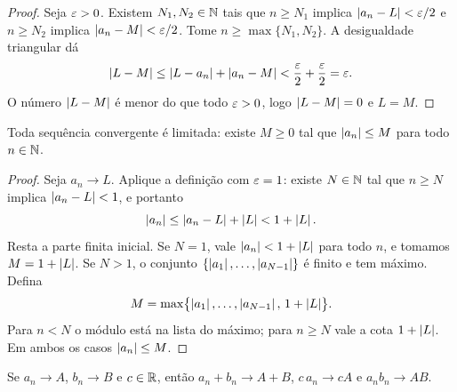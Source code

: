 \documentclass[11pt,a4paper]{article}
\begin{document}
\begin{proof}
Seja \(\varepsilon>0\). Existem \(N_1,N_2\in\mathbb{N}\) tais que \(n\ge N_1\) implica \(\left\lvert a_n-L \right\rvert<\varepsilon/2\) e \(n\ge N_2\) implica \(\left\lvert a_n-M \right\rvert<\varepsilon/2\). Tome \(n\ge\max\{N_1,N_2\}\). A desigualdade triangular dá
\[
\left\lvert L-M \right\rvert
\le\left\lvert L-a_n \right\rvert+\left\lvert a_n-M \right\rvert
<\frac{\varepsilon}{2}+\frac{\varepsilon}{2}
=\varepsilon.
\]
O número \(\left\lvert L-M \right\rvert\) é menor do que todo \(\varepsilon>0\), logo \(\left\lvert L-M \right\rvert=0\) e \(L=M\).
\end{proof}

\begin{teorema}
Toda sequência convergente é limitada: existe \(M\ge 0\) tal que \(\left\lvert a_n \right\rvert\le M\) para todo \(n\in\mathbb{N}\).
\end{teorema}

\begin{proof}
Seja \(a_n\to L\). Aplique a definição com \(\varepsilon=1\): existe \(N\in\mathbb{N}\) tal que \(n\ge N\) implica \(\left\lvert a_n-L \right\rvert<1\), e portanto
\[
\left\lvert a_n \right\rvert\le\left\lvert a_n-L \right\rvert+\left\lvert L \right\rvert<1+\left\lvert L \right\rvert.
\]
Resta a parte finita inicial. Se \(N=1\), vale \(\left\lvert a_n \right\rvert<1+\left\lvert L \right\rvert\) para todo \(n\), e tomamos \(M=1+\left\lvert L \right\rvert\). Se \(N>1\), o conjunto \(\{\left\lvert a_1 \right\rvert,\ldots,\left\lvert a_{N-1} \right\rvert\}\) é finito e tem máximo. Defina
\[
M=\max\bigl\{\left\lvert a_1 \right\rvert,\ldots,\left\lvert a_{N-1} \right\rvert,\,1+\left\lvert L \right\rvert\bigr\}.
\]
Para \(n<N\) o módulo está na lista do máximo; para \(n\ge N\) vale a cota \(1+\left\lvert L \right\rvert\). Em ambos os casos \(\left\lvert a_n \right\rvert\le M\).
\end{proof}


\begin{teorema}
Se \(a_n\to A\), \(b_n\to B\) e \(c\in\mathbb{R}\), então \(a_n+b_n\to A+B\), \(c\,a_n\to cA\) e \(a_nb_n\to AB\).
\end{teorema}
\end{document}
